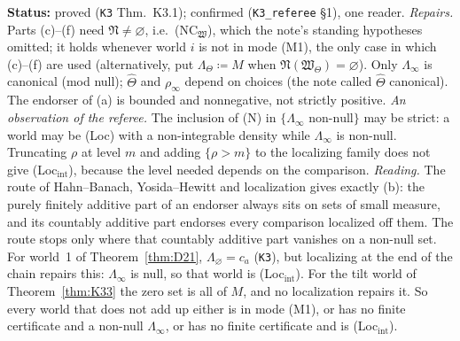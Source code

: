 \documentclass[11pt]{article}
\theoremstyle{definition}
\theoremstyle{remark}
\newcommand{\src}[1]{\texttt{#1}}
\newcommand{\status}[1]{\par\smallskip\noindent\textbf{Status:} #1\par\smallskip}
\begin{document}
\status{proved (\src{K3} Thm.~K3.1); confirmed (\src{K3\_referee} \S1), one reader. \emph{Repairs.} Parts (c)--(f) need $\mathfrak N\ne\varnothing$, i.e.\ (NC$_{\mathfrak W}$), which the note's standing hypotheses omitted; it holds whenever world $i$ is not in mode (M1), the only case in which (c)--(f) are used (alternatively, put $\Lambda_\Theta\coloneqq M$ when $\mathfrak N(\mathfrak W_\Theta)=\varnothing$). Only $\Lambda_\infty$ is canonical (mod null); $\hat\Theta$ and $\rho_\infty$ depend on choices (the note called $\hat\Theta$ canonical). The endorser of (a) is bounded and nonnegative, not strictly positive. \emph{An observation of the referee.} The inclusion of (N) in $\{\Lambda_\infty\text{ non-null}\}$ may be strict: a world may be (Loc) with a non-integrable density while $\Lambda_\infty$ is non-null. Truncating $\rho$ at level $m$ and adding $\{\rho>m\}$ to the localizing family does not give (Loc$_{\mathrm{int}}$), because the level needed depends on the comparison. \emph{Reading.} The route of Hahn--Banach, Yosida--Hewitt and localization gives exactly (b): the purely finitely additive part of an endorser always sits on sets of small measure, and its countably additive part endorses every comparison localized off them. The route stops only where that countably additive part vanishes on a non-null set. For world~1 of Theorem~\ref{thm:D21}, $\Lambda_\varnothing=c_a$ (\src{K3}), but localizing at the end of the chain repairs this: $\Lambda_\infty$ is null, so that world is (Loc$_{\mathrm{int}}$). For the tilt world of Theorem~\ref{thm:K33} the zero set is all of $M$, and no localization repairs it. So every world that does not add up either is in mode (M1), or has no finite certificate and a non-null $\Lambda_\infty$, or has no finite certificate and is (Loc$_{\mathrm{int}}$).}
\end{document}
